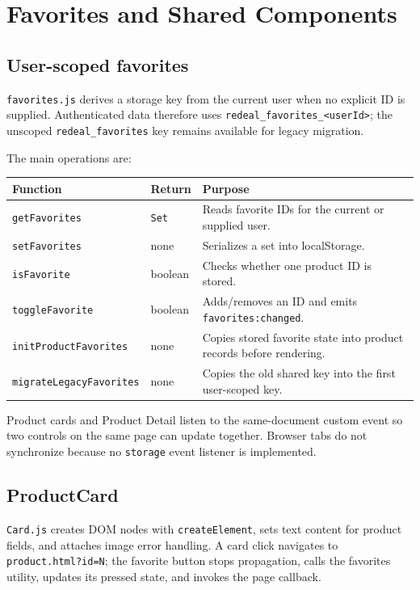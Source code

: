 \documentclass[10pt]{article}
\newcommand{\code}[1]{\texttt{#1}}
\begin{document}
\clearpage
\section{Favorites and Shared Components}

\subsection{User-scoped favorites}

\code{favorites.js} derives a storage key from the current user when no explicit ID is supplied. Authenticated data therefore uses \code{redeal\_favorites\_<userId>}; the unscoped \code{redeal\_favorites} key remains available for legacy migration.

The main operations are:

\begin{tabular}{@{}p{3.6cm}p{3.3cm}p{6.4cm}@{}}
\toprule
\textbf{Function} & \textbf{Return} & \textbf{Purpose} \\
\midrule
\code{getFavorites} & \code{Set} & Reads favorite IDs for the current or supplied user. \\
\code{setFavorites} & none & Serializes a set into localStorage. \\
\code{isFavorite} & boolean & Checks whether one product ID is stored. \\
\code{toggleFavorite} & boolean & Adds/removes an ID and emits \code{favorites:changed}. \\
\code{initProductFavorites} & none & Copies stored favorite state into product records before rendering. \\
\code{migrateLegacyFavorites} & none & Copies the old shared key into the first user-scoped key. \\
\bottomrule
\end{tabular}

Product cards and Product Detail listen to the same-document custom event so two controls on the same page can update together. Browser tabs do not synchronize because no \code{storage} event listener is implemented.

\subsection{ProductCard}

\code{Card.js} creates DOM nodes with \code{createElement}, sets text content for product fields, and attaches image error handling. A card click navigates to \code{product.html?id=N}; the favorite button stops propagation, calls the favorites utility, updates its pressed state, and invokes the page callback.
\end{document}
